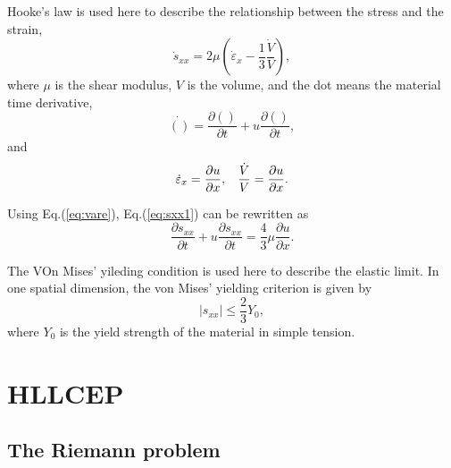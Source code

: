 \documentclass{article}
\theoremstyle{plain}\newtheorem{definition}{\sc{Definition}}
\theoremstyle{defination}\newtheorem{example}{Example}[section]
\numberwithin{equation}{section}
\numberwithin{table}{section}
\begin{document}
Hooke's law is used here to describe the relationship between the stress and the strain, 
\begin{equation}\label{eq:sxx1}
\dot{s}_{xx} = 2\mu \left(\dot{\varepsilon}_x-\frac{1}{3}\frac{\dot{V}}{V}\right),
\end{equation}
where $\mu$ is the shear modulus, $V$ is the volume, and the dot means the material time derivative,
\begin{equation}
  \dot{()} = \frac{\partial ()}{\partial t} + u \frac{\partial ()}{\partial t},
\end{equation}
and
\begin{equation}\label{eq:vare}
  \dot{\varepsilon}_x = \frac{\partial u}{\partial x}, \hspace{0.3cm} \frac{\dot{V}}{V} = \frac{\partial u}{\partial x}.
\end{equation}

Using Eq.(\ref{eq:vare}), Eq.(\ref{eq:sxx1}) can be rewritten as 
\begin{equation}
  \frac{\partial s_{xx}}{\partial t} + u \frac{\partial s_{xx}}{\partial t} =\frac{4}{3}\mu \frac{\partial u}{\partial x}.
\end{equation}

The VOn Mises' yileding condition is used here to describe the elastic limit. In one spatial dimension, the von Mises' yielding criterion is given by
\begin{equation}
  |s_{xx}| \le \frac{2}{3}Y_0,
\end{equation}
where $Y_0$ is the yield strength of the material in simple tension.


\section{HLLCEP}
\subsection{The Riemann problem}
\end{document}
